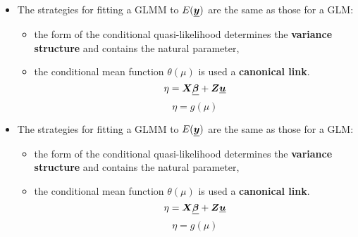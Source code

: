 \begin{frame}
  \begin{itemize}
    \vspace{0.75cm}
    \item The strategies for fitting a GLMM to $ E(\boldsymbol{\underline{y}}) $ are the same as those for a GLM:
    \begin{itemize}
      \vspace{0.25cm}
      \item the form of the conditional quasi-likelihood determines the \textbf{variance structure} and contains the natural parameter,
      \vspace{0.25cm}
      \item the conditional mean function $ \theta(\mu) $ is used a \textbf{canonical link}.
        $$ \eta = \boldsymbol{X} \boldsymbol{\underline{\beta}} + \boldsymbol{Z} \boldsymbol{\underline{u}} $$
        $$ \eta = g(\mu) $$
    \end{itemize}
  \end{itemize}
\end{frame}
 


\begin{frame}
  \begin{itemize}
    \vspace{0.75cm}
    \item The strategies for fitting a GLMM to $ E(\boldsymbol{\underline{y}}) $ are the same as those for a GLM:
    \begin{itemize}
      \vspace{0.25cm}
      \item the form of the conditional quasi-likelihood determines the \textbf{variance structure} and contains the natural parameter,
      \vspace{0.25cm}
      \item the conditional mean function $ \theta(\mu) $ is used a \textbf{canonical link}.
        $$ \eta = \boldsymbol{X} \boldsymbol{\underline{\beta}} + \boldsymbol{Z} \boldsymbol{\underline{u}} $$
        $$ \eta = g(\mu) $$
    \end{itemize}
  \end{itemize}
\end{frame}



